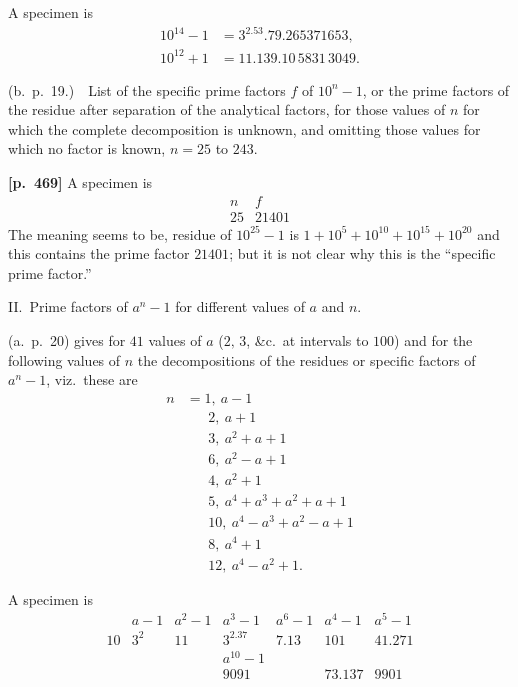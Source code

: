 \documentclass[11pt,a4paper]{article}
\begin{document}
A specimen is
\[
\begin{aligned}
10^{14}-1 &= 3^2.53.79.265371653, \\
10^{12}+1 &= 11.139.10\,5831\,3049.
\end{aligned}
\]

(b.\ p.~19.)\ \ List of the specific prime factors $f$ of $10^n-1$, or the prime factors of the residue after separation of the analytical factors, for those values of $n$ for which the complete decomposition is unknown, and omitting those values for which no factor is known, $n=25$ to $243$.

\bigskip
\noindent\textbf{[p.~469]}\quad
A specimen is
\[
\begin{array}{c|c}
n & f \\\hline
25 & 21401
\end{array}
\]
The meaning seems to be, residue of $10^{25}-1$ is $1+10^5+10^{10}+10^{15}+10^{20}$ and this contains the prime factor $21401$; but it is not clear why this is the ``specific prime factor.''

II.\ Prime factors of $a^n-1$ for different values of $a$ and $n$.

(a.\ p.~20) gives for $41$ values of $a$ ($2,\,3$, \&c.\ at intervals to $100$) and for the following values of $n$ the decompositions of the residues or specific factors of $a^n-1$, viz.\ these are
\[
\begin{aligned}
n &= 1,\ a-1 \\
  &\phantom{=\;}2,\ a+1 \\
  &\phantom{=\;}3,\ a^2+a+1 \\
  &\phantom{=\;}6,\ a^2-a+1 \\
  &\phantom{=\;}4,\ a^2+1 \\
  &\phantom{=\;}5,\ a^4+a^3+a^2+a+1 \\
  &\phantom{=\;}10,\ a^4-a^3+a^2-a+1 \\
  &\phantom{=\;}8,\ a^4+1 \\
  &\phantom{=\;}12,\ a^4-a^2+1.
\end{aligned}
\]

A specimen is
\[
\begin{array}{c|c|c|c|c|c|c}
   & a-1 & a^2-1 & a^3-1 & a^6-1 & a^4-1 & a^5-1 \\\hline
10 & 3^2 & 11 & 3^2.37 & 7.13 & 101 & 41.271 \\
   & & & a^{10}-1 &  &  & \\
   & & & 9091 & & 73.137 & 9901
\end{array}
\]
\end{document}
